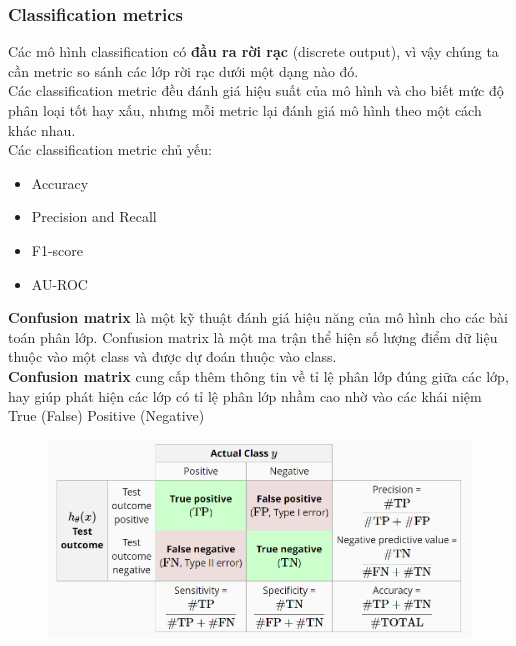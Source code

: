 \subsubsection{Classification metrics}
Các mô hình classification có \textbf{đầu ra rời rạc} (discrete output), vì vậy chúng ta cần metric so sánh các lớp rời rạc dưới một dạng nào đó.\\
Các classification metric đều đánh giá hiệu suất của mô hình và cho biết mức độ phân loại tốt hay xấu, nhưng mỗi metric lại đánh giá mô hình theo một cách khác nhau.\\
Các classification metric chủ yếu:
\begin{itemize}
    \item Accuracy
    \item Precision and Recall
    \item F1-score
    \item AU-ROC
\end{itemize}

\textbf{Confusion matrix} \cite{mlwiki} \cite{aiuit} là một kỹ thuật đánh giá hiệu năng của mô hình cho các bài toán phân lớp. Confusion matrix là một ma trận thể hiện số lượng điểm dữ liệu thuộc vào một class và được dự đoán thuộc vào class.\\
\textbf{Confusion matrix} cung cấp thêm thông tin về tỉ lệ phân lớp đúng giữa các lớp, hay giúp phát hiện các lớp có tỉ lệ phân lớp nhầm cao nhờ vào các khái niệm True (False) Positive (Negative)\\

\begin{figure}[H]
    \centering
    \includegraphics[width=1\linewidth]{img/binary_classifiers.png}
\end{figure}

